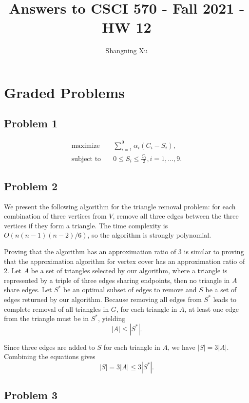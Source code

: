 \documentclass{article}
\title{Answers to CSCI 570 - Fall 2021 - HW 12}
\author{Shangning Xu}
\begin{document}
\maketitle

\section*{Graded Problems}

\subsection*{Problem 1}

\begin{align*}
    \textrm{maximize}&\quad \sum_{i = 1}^9 \alpha_i(C_i - S_i),\\
    \textrm{subject to}&\quad 0 \le S_i \le \frac{C_i}{2}, i = 1, \dots, 9.
\end{align*}

\subsection*{Problem 2}

We present the following algorithm for the triangle removal problem: for each combination of three vertices from $V$, remove all three edges between the three vertices if they form a triangle. The time complexity is $O(n(n - 1)(n - 2)/6)$, so the algorithm is strongly polynomial.

Proving that the algorithm has an approximation ratio of 3 is similar to proving that the approximation algorithm for vertex cover has an approximation ratio of 2. Let $A$ be a set of triangles selected by our algorithm, where a triangle is represented by a triple of three edges sharing endpoints, then no triangle in $A$ share edges. Let $S^*$ be an optimal subset of edges to remove and $S$ be a set of edges returned by our algorithm. Because removing all edges from $S^*$ leads to complete removal of all triangles in $G$, for each triangle in $A$, at least one edge from the triangle must be in $S^*$, yielding
\[
    |A| \le |S^*|.
\]

Since three edges are added to $S$ for each triangle in $A$, we have $|S| = 3|A|$. Combining the equations gives
\[
    |S| = 3|A| \le 3|S^*|.
\]

\subsection*{Problem 3}
\end{document}
